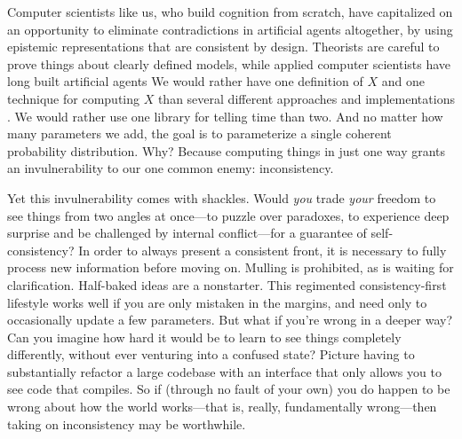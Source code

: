 
Computer scientists like us, who build cognition from scratch, have capitalized on an opportunity to eliminate contradictions in artificial agents altogether, by using epistemic representations that are consistent by design.
Theorists are careful to prove things about clearly defined models,
while applied computer scientists have long built artificial agents
%
%
We would rather have one definition of $X$ and one technique for computing $X$ than several different approaches and implementations
    . 
We would rather use one library for telling time than two.
And no matter how many parameters we add, the goal is to parameterize a single coherent probability distribution. 
Why? Because computing things in just one way grants an invulnerability to our one common enemy: inconsistency.

Yet this invulnerability comes with shackles.
Would \emph{you} trade \emph{your} freedom to see things from two angles at once---to puzzle over paradoxes, to experience deep surprise and be challenged by internal conflict---for a guarantee of self-consistency?
%
In order to always present a consistent front, it is necessary to fully process new information before moving on. Mulling is prohibited, as
is waiting for clarification.
Half-baked ideas are a nonstarter.
This regimented consistency-first lifestyle works well if you are only mistaken in the margins, and need only to occasionally update a few parameters.
But what if you're wrong in a deeper way?
Can you imagine how hard it would be to learn to see things completely differently, without ever venturing into a confused state?
Picture having to substantially refactor a large codebase with an interface that only allows you to see code that compiles.
So if (through no fault of your own) you do happen to be wrong about how the world works---that is, really, fundamentally wrong---then taking on inconsistency may be worthwhile.

